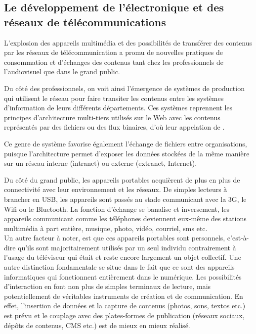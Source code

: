 

\subsection{Le développement de l'électronique et des réseaux de télécommunications}\label{sec:electro}

L’explosion des appareils multimédia et des possibilités de transférer des contenus par les réseaux de télécommunication a promu de nouvelles pratiques de consommation et d'échanges des contenus tant chez les professionnels de l'audiovisuel que dans le grand public.

Du côté des professionnels, on voit ainsi l’émergence de systèmes de production qui utilisent le réseau pour faire transiter les contenus entre les systèmes d'information de leurs différents départements. 
Ces systèmes reprennent les principes d'architecture multi-tiers utilisés sur le Web avec les contenus représentés par des fichiers ou des flux binaires, d'où leur appelation de .

Ce genre de système favorise également l’échange de fichiers entre organisations, puisque l’architecture permet d'exposer les données stockées de la même manière sur un réseau interne (intranet) ou externe (extranet, Internet).

Du côté du grand public, les appareils portables acquièrent de plus en plus de connectivité avec leur environnement et les réseaux. 
De simples lecteurs à brancher en USB, les appareils sont passés au stade communicant avec la 3G, le Wifi ou le Bluetooth. 
La fonction d'échange se banalise et inversement, les appareils communicant comme les téléphones deviennent eux-même des stations multimédia à part entière, musique, photo, vidéo, courriel, sms etc.\\


Un autre facteur à noter, est que ces appareils portables sont personnels, c’est-à-dire qu’ils sont majoritairement utilisés par un seul individu contrairement à l’usage du téléviseur qui était et reste encore largement un objet collectif. 
Une autre distinction fondamentale se situe dans le fait que ce sont des appareils informatiques qui fonctionnent entièrement dans le numérique. 
Les possibilités d’interaction en font non plus de simples terminaux de lecture, mais potentiellement de véritables instruments de création et de communication. En effet, l'insertion de données et la capture de contenus (photos, sons, textos etc.) est prévu et le couplage avec des plates-formes de publication (réseaux sociaux, dépôts de contenus, CMS etc.) est de mieux en mieux réalisé.

